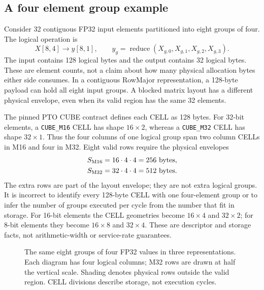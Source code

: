 \subsection{A four element group example}

Consider 32 contiguous FP32 input elements partitioned into eight groups of four. The logical operation is
\begin{equation}
 X[8,4]\longrightarrow y[8,1],\qquad
 y_g=\operatorname{reduce}(X_{g,0},X_{g,1},X_{g,2},X_{g,3}).
 \label{eq:u005-four}
\end{equation}
The input contains 128 logical bytes and the output contains 32 logical bytes. These are element counts, not a claim about how many physical allocation bytes either side consumes. In a contiguous RowMajor representation, a 128-byte payload can hold all eight input groups. A blocked matrix layout has a different physical envelope, even when its valid region has the same 32 elements.

The pinned PTO CUBE contract defines each CELL as 128 bytes. For 32-bit elements, a \texttt{CUBE\_M16} CELL has shape $16\times2$, whereas a \texttt{CUBE\_M32} CELL has shape $32\times1$. Thus the four columns of one logical group span two column CELLs in M16 and four in M32. Eight valid rows require the physical envelopes
\begin{align}
 S_{\rm M16}&=16\cdot4\cdot4=256\text{ bytes},\\
 S_{\rm M32}&=32\cdot4\cdot4=512\text{ bytes}.
 \label{eq:u005-envelope}
\end{align}
The extra rows are part of the layout envelope; they are not extra logical groups. It is incorrect to identify every 128-byte CELL with one four-element group or to infer the number of groups executed per cycle from the number that fit in storage. For 16-bit elements the CELL geometries become $16\times4$ and $32\times2$; for 8-bit elements they become $16\times8$ and $32\times4$. These are descriptor and storage facts, not arithmetic-width or service-rate guarantees.~\citep{u005-pto-cell}

\begin{figure}[tb]
\centering

\caption{The same eight groups of four FP32 values in three representations. Each diagram has four logical columns; M32 rows are drawn at half the vertical scale. Shading denotes physical rows outside the valid region. CELL divisions describe storage, not execution cycles.}
\label{fig:u005-cells}
\end{figure}

